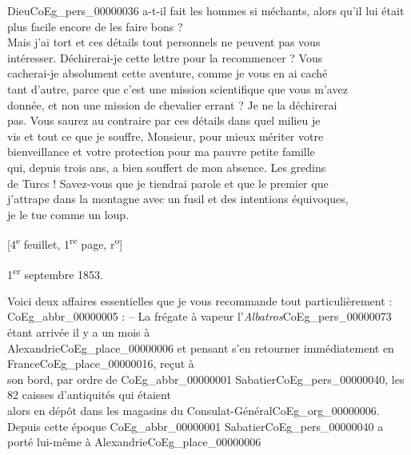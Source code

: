 \documentclass{book}
\begin{document}
Dieu\gls{CoEg_pers_00000036} a-t-il fait les hommes si méchants, alors qu’il lui était\\
plus facile encore de les faire bons ?\\
\indent Mais j’ai tort et ces détails tout personnels ne peuvent pas vous\\
intéresser. Déchirerai-je cette lettre pour la recommencer ? Vous\\
cacherai-je absolument cette aventure, comme je vous en ai caché\\
tant d’autre, parce que c’est une mission scientifique que vous m’avez\\
donnée, et non une mission de chevalier errant ? Je ne la déchirerai\\
pas. Vous saurez au contraire par ces détails dans quel milieu je\\
vis et tout ce que je souffre, Monsieur, pour mieux mériter votre\\
bienveillance et votre protection pour ma pauvre petite famille\\
qui, depuis trois ans, a bien souffert de mon absence. Les gredins\\
de Turcs ! Savez-vous que je tiendrai parole et que le premier que\\
j’attrape dans la montagne avec un fusil et des intentions équivoques,\\
je le tue comme un loup.
{\footnotesize\begin{center} {[4\textsuperscript{e} feuillet, 1\textsuperscript{re} page, r\textsuperscript{o}]}\end{center}}
\begin{flushright}1\textsuperscript{er} septembre 1853.\end{flushright}
\indent Voici deux affaires essentielles que je vous recommande tout particulièrement :\\
\indent \gls{CoEg_abbr_00000005} : – La frégate à vapeur l’\textit{Albatros}\gls{CoEg_pers_00000073} étant arrivée il y a un mois à\\
Alexandrie\gls{CoEg_place_00000006} et pensant s’en retourner immédiatement en France\gls{CoEg_place_00000016}, reçut à\\
son bord, par ordre de \gls{CoEg_abbr_00000001} Sabatier\gls{CoEg_pers_00000040}, les 82 caisses d’antiquités qui étaient\\
alors en dépôt dans les magasins du Consulat-Général\gls{CoEg_org_00000006}.\\
\indent Depuis cette époque  \gls{CoEg_abbr_00000001} Sabatier\gls{CoEg_pers_00000040} a porté lui-même à Alexandrie\gls{CoEg_place_00000006}\\
\end{document}
